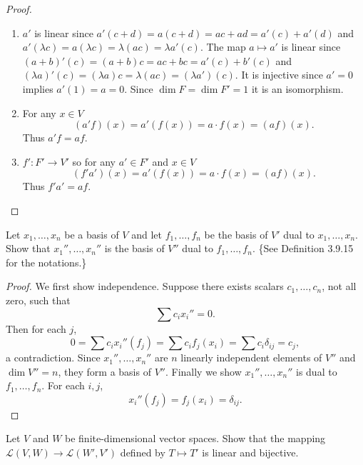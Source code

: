 \begin{proof}
    \begin{enumerate}
        \item[(i)] $a'$ is linear since $a'(c + d) = a(c+d) = ac + ad = a'(c) + a'(d)$ 
        and $a'(\lambda c) = a(\lambda c) = \lambda(ac) = \lambda a'(c)$.
        The map $a \mapsto a'$ is linear since $(a+b)'(c) = (a+b)c = ac + bc = a'(c) + b'(c)$
        and $(\lambda a)'(c) = (\lambda a)c = \lambda(ac) = (\lambda a')(c)$.
        It is injective since $a' = 0$ implies $a'(1) = a = 0$.
        Since $\dim F = \dim F' = 1$ it is an isomorphism.

        \item[(ii)] For any $x \in V$
        \[(a'f)(x) = a'(f(x)) = a \cdot f(x) = (af)(x).\]
        Thus $a'f = af$.

        \item[(iii)] $f' : F' \to V'$ so for any $a' \in F'$ and $x \in V$
        \[(f'a')(x) = a'(f(x)) = a \cdot f(x) = (af)(x).\]
        Thus $f'a' = af$.
    \end{enumerate}
\end{proof}

 
\begin{tcolorbox}[title=Exercise 9, breakable]
    Let $x_1, \ldots, x_n$ be a basis of $V$ and let $f_1, \ldots, f_n$ be the basis of $V'$ 
    dual to $x_1, \ldots, x_n$. Show that $x_1'', \ldots, x_n''$ is the basis of $V''$ dual to 
    $f_1, \ldots, f_n$. \{See Definition 3.9.15 for the notations.\}
\end{tcolorbox}

\begin{proof}
    We first show independence.
    Suppose there exists scalars $c_1, \ldots, c_n$, not all zero, such that 
    \[\sum c_i x_i'' = 0.\]
    Then for each $j$,
    \[0 = \sum c_i x_i''(f_j) = \sum c_i f_j(x_i) = \sum c_i \delta_{ij} = c_j,\]
    a contradiction.
    Since $x_1'', \ldots, x_n''$ are $n$ linearly independent elements of $V''$ 
    and $\dim V'' = n$, they form a basis of $V''$.
    Finally we show $x_1'', \ldots, x_n''$ is dual to $f_1, \ldots, f_n$.
    For each $i, j$,
    \[x_i''(f_j) = f_j(x_i) = \delta_{ij}.\]
\end{proof}

\begin{tcolorbox}[title=Exercise 10, breakable]
    Let $V$ and $W$ be finite-dimensional vector spaces. Show that the mapping 
    $\mathcal{L}(V, W) \to \mathcal{L}(W', V')$ defined by $T \mapsto T'$ is linear and bijective.
\end{tcolorbox}

